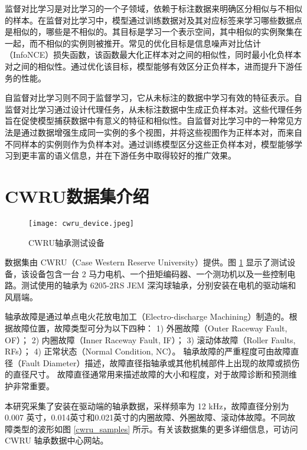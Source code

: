 \documentclass[master]{thesis-uestc}
\begin{document}
监督对比学习是对比学习的一个子领域，依赖于标注数据来明确区分相似与不相似的样本。在监督对比学习中，模型通过训练数据对及其对应标签来学习哪些数据点是相似的，哪些是不相似的。其目标是学习一个表示空间，其中相似的实例聚集在一起，而不相似的实例则被推开。常见的优化目标是信息噪声对比估计（InfoNCE）损失函数，该函数最大化正样本对之间的相似性，同时最小化负样本对之间的相似性。通过优化该目标，模型能够有效区分正负样本，进而提升下游任务的性能。

自监督对比学习则不同于监督学习，它从未标注的数据中学习有效的特征表示。自监督对比学习通过设计代理任务，从未标注数据中生成正负样本对。这些代理任务旨在促使模型捕获数据中有意义的特征和相似性。自监督对比学习中的一种常见方法是通过数据增强生成同一实例的多个视图，并将这些视图作为正样本对，而来自不同样本的实例则作为负样本对。通过训练模型区分这些正负样本对，模型能够学习到更丰富的语义信息，并在下游任务中取得较好的推广效果。

\section{CWRU数据集介绍}
\begin{figure}
    \centering
    \texttt{[image: cwru\_device.jpeg]}
    \caption{CWRU轴承测试设备}
    \label{cwru_device}
\end{figure}
数据集由 CWRU（Case Western Reserve University）提供。图 \ref{cwru_device} 显示了测试设备，该设备包含一台 2 马力电机、一个扭矩编码器、一个测功机以及一些控制电路。测试使用的轴承为 6205-2RS JEM 深沟球轴承，分别安装在电机的驱动端和风扇端。  

轴承故障是通过单点电火花放电加工（Electro-discharge Machining）制造的。根据故障位置，故障类型可分为以下四种：  
1) 外圈故障（Outer Raceway Fault, OF）；  
2) 内圈故障（Inner Raceway Fault, IF）；  
3) 滚动体故障（Roller Faults, RFs）；  
4) 正常状态（Normal Condition, NC）。  
轴承故障的严重程度可由故障直径（Fault Diameter）描述，故障直径指轴承或其他机械部件上出现的故障或损伤的直径尺寸。 故障直径通常用来描述故障的大小和程度，对于故障诊断和预测维护非常重要。

本研究采集了安装在驱动端的轴承数据，采样频率为 12 kHz，故障直径分别为 0.007 英寸，0.014英寸和0.021英寸的内圈故障、外圈故障、滚动体故障。不同故障类型的波形如图 \ref{cwru_samples} 所示。有关该数据集的更多详细信息，可访问 CWRU 轴承数据中心网站。  
\end{document}
